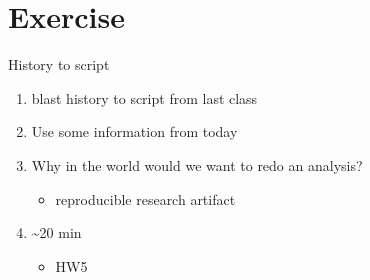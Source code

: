 \documentclass[t,10pt]{beamer}
\begin{document}
\section{Exercise}
\label{sec:orgheadline28}
\begin{frame}[label={sec:orgheadline27}]{History to script}
\begin{enumerate}[<+->]
\item blast history to script from last class
\item Use some information from today
\item Why in the world would we want to redo an analysis?
\begin{itemize}
\item reproducible research artifact
\end{itemize}
\item \textasciitilde{}20 min
\begin{itemize}
\item HW5
\end{itemize}
\end{enumerate}
\end{frame}
\end{document}

